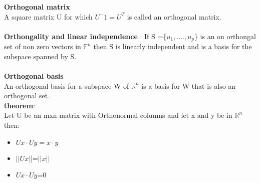 \documentclass[12pt]{article}
\newcommand{\R}{\mathbb{R}}
\newcommand{\F}{\mathbb{F}}
\begin{document}
\textbf{Orthogonal matrix}\\
A square matrix U for which $U^-1=U^T$ is called an orthogonal matrix. \\\\
\textbf{Orthongality and linear independence }:
If S =\{$u_1,....,u_p\}$ is an on orthongal set of non zero vectors in $\F^n$ then S  is linearly independent and is a basis for the subspace spanned by S. \\\\
\textbf{Orthogonal basis}\\ An orthogonal basis for a subspace W of $\R^n$ is  a basis for W that is also an orthogonal set.\\
\textbf{theorem}:\\
Let U be an mxn matrix with Orthonormal columns and let x and y be in $\R^n$ then:
\begin{itemize}
  \item $Ux \cdot Uy=x\cdot y$
  \item $||Ux||$=$||x||$
  \item $Ux \cdot Uy$=0
\end{itemize}\\
\textbf{}
\end{document}
